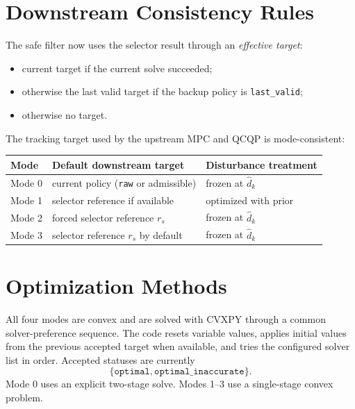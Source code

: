 \documentclass[11pt]{article}
\begin{document}
\section{Downstream Consistency Rules}
The safe filter now uses the selector result through an \emph{effective target}:
\begin{itemize}
\item current target if the current solve succeeded;
\item otherwise the last valid target if the backup policy is \texttt{last\_valid};
\item otherwise no target.
\end{itemize}
The tracking target used by the upstream MPC and QCQP is mode-consistent:
\begin{center}
\begin{tabular}{lll}
\toprule
Mode & Default downstream target & Disturbance treatment \\
\midrule
Mode 0 & current policy (\texttt{raw} or admissible) & frozen at $\hat d_k$ \\
Mode 1 & selector reference if available & optimized with prior \\
Mode 2 & forced selector reference $r_s$ & frozen at $\hat d_k$ \\
Mode 3 & selector reference $r_s$ by default & frozen at $\hat d_k$ \\
\bottomrule
\end{tabular}
\end{center}

\section{Optimization Methods}
All four modes are convex and are solved with CVXPY through a common solver-preference sequence. The code resets variable values, applies initial values from the previous accepted target when available, and tries the configured solver list in order. Accepted statuses are currently
\[
\{\texttt{optimal},\texttt{optimal\_inaccurate}\}.
\]
Mode 0 uses an explicit two-stage solve. Modes 1--3 use a single-stage convex problem.
\end{document}
